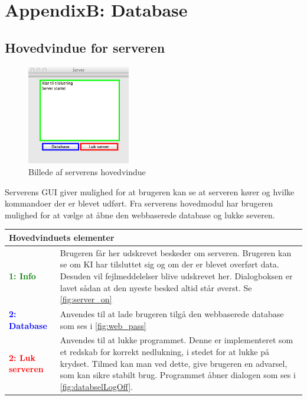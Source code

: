 \chapter*{AppendixB: Database}
\section*{Hovedvindue for serveren}
\begin{figure}[htbp]
	\centering
	\includegraphics[width=0.4\textwidth]{billeder/database/server}
	\caption{Billede af serverens hovedvindue}
	\label{fig:server}
\end{figure}
Serverens GUI giver mulighed for at brugeren kan se at serveren kører og hvilke kommandoer der er blevet udført. Fra serverens hovedmodul har brugeren mulighed for at vælge at åbne den webbaserede database og lukke severen.
\begin{table}[H]
\begin{tabular}{l p{12.5cm}}
\multicolumn{2}{l}{Hovedvinduets elementer} \\
\hline
\textcolor{green}{\textbf{1: Info}}
&Brugeren får her udskrevet beskeder om serveren. Brugeren kan se om KI har tilsluttet sig og om der er blevet overført data. Desuden vil fejlmeddelelser blive udskrevet her. Dialogboksen er lavet sådan at den nyeste besked altid står øverst. Se \ref{fig:server_on}\\

\textcolor{blue}{\textbf{2: Database}}
&Anvendes til at lade brugeren tilgå den webbaserede database som ses i \ref{fig:web_pass}\\

\textcolor{red}{\textbf{2: Luk serveren}}
&Anvendes til at lukke programmet. Denne er implementeret som et redskab for korrekt nedlukning, i stedet for at lukke på krydset. Tilmed kan man ved dette, give brugeren en advarsel, som kan sikre stabilt brug. Programmet åbner dialogen som ses i \ref{fig:databselLogOff}.\\

\end{tabular}
\end{table}

